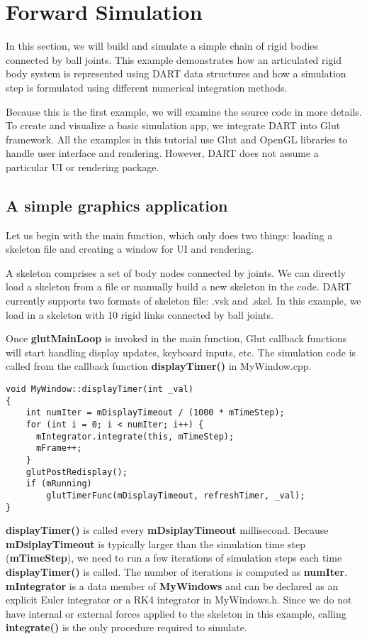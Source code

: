 \section{Forward Simulation}
In this section, we will build and simulate a simple chain of rigid
bodies connected by ball joints. This example demonstrates how an
articulated rigid body system is represented using DART data
structures and how a simulation step is formulated using different
numerical integration methods.

Because this is the first example, we will examine the source code in
more details. To create and visualize a basic simulation app, we
integrate DART into Glut framework. All the examples in this tutorial
use Glut and OpenGL libraries to handle user interface and
rendering. However, DART does not assume a particular UI or rendering
package. 


\subsection{A simple graphics application}
Let us begin with the main function, which only does two things:
loading a skeleton file and creating a window for UI and rendering.

A skeleton comprises a set of body nodes connected by
joints. We can directly load a skeleton from a file or manually build a new
skeleton in the code. DART currently supports two formats of skeleton
file: .vsk and .skel. In this example, we load in a skeleton with 10
rigid links connected by ball joints. 

Once \textbf{glutMainLoop} is invoked in the main function, Glut
callback functions will start handling display updates, keyboard
inputs, etc. The simulation code is called from the callback function
\textbf{displayTimer()} in MyWindow.cpp.

\ttfamily
\begin{lstlisting}[label=displayTimer,caption=displayTimer]
void MyWindow::displayTimer(int _val)
{
    int numIter = mDisplayTimeout / (1000 * mTimeStep);
    for (int i = 0; i < numIter; i++) {
      mIntegrator.integrate(this, mTimeStep);
      mFrame++;
    }
    glutPostRedisplay();
    if (mRunning)	
        glutTimerFunc(mDisplayTimeout, refreshTimer, _val);
}
\end{lstlisting}
\rmfamily
\textbf{displayTimer()} is called every \textbf{mDsiplayTimeout}
millisecond. Because \textbf{mDsiplayTimeout} is typically larger than
the simulation time step (\textbf{mTimeStep}), we need to run a few
iterations of simulation steps each time \textbf{displayTimer()} is
called. The number of iterations is computed as
\textbf{numIter}. \textbf{mIntegrator} is a data member of
\textbf{MyWindows} and can be declared as an explicit Euler integrator
or a RK4 integrator in MyWindows.h. Since we do not have
internal or external forces applied to the skeleton in this example,
calling \textbf{integrate()} is the only procedure required to
simulate.

